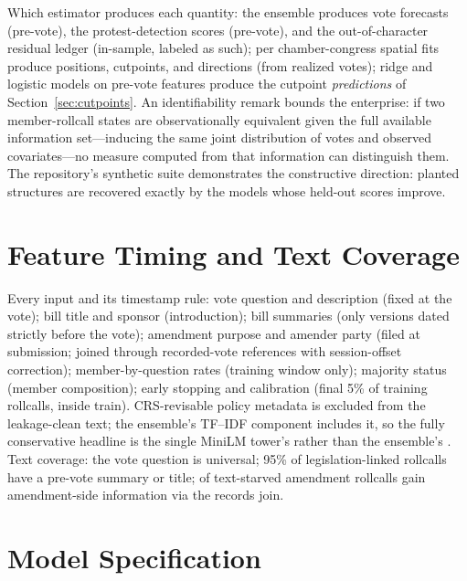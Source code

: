 \documentclass[12pt]{article}
\begin{document}
Which estimator produces each quantity:
the ensemble produces vote forecasts (pre-vote), the protest-detection
scores (pre-vote), and the out-of-character residual ledger
(in-sample, labeled as such); per chamber-congress spatial fits
produce positions, cutpoints, and directions (from realized votes);
ridge and logistic models on pre-vote features produce the cutpoint
\emph{predictions} of Section~\ref{sec:cutpoints}. An identifiability
remark bounds the enterprise: if two member-rollcall states are
observationally equivalent given the full available information
set---inducing the same joint distribution of votes and observed
covariates---no measure computed from that information can
distinguish them. The
repository's synthetic suite demonstrates the constructive direction:
planted structures are recovered exactly by the models whose held-out
scores improve.

\section{Feature Timing and Text Coverage}
\label{app:audit}

Every input and its timestamp rule: vote question and description
(fixed at the vote); bill title and sponsor (introduction); bill
summaries (only versions dated strictly before the vote); amendment
purpose and amender party (filed at submission; joined through
recorded-vote references with session-offset correction);
member-by-question rates (training window only); majority status
(member composition); early stopping and calibration (final 5\% of
training rollcalls, inside train). CRS-revisable policy metadata is
excluded from the leakage-clean text; the ensemble's TF--IDF
component includes it, so the fully conservative headline is the
single MiniLM tower's \incForecastLL{} rather than the ensemble's
\champForecastLL. Text coverage: the vote question is universal; 95\%
of legislation-linked rollcalls have a pre-vote summary or title;
\amdtFilledNoDesc{} of \amdtNoDesc{} text-starved amendment rollcalls
gain amendment-side information via the records join.

\section{Model Specification}
\label{app:spec}
\end{document}
